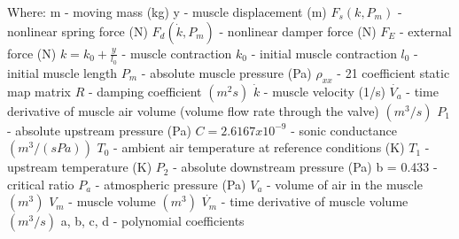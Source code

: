\documentclass[11pt,a4paper]{article}
\begin{document}
\begin{appendices}
Where: \newline
m - moving mass (kg)\newline
y - muscle displacement (m)\newline
$F_s(k, P_m)$ - nonlinear spring force (N)\newline
$F_d(\dot{k}, P_m)$ - nonlinear damper force (N)\newline
$F_E$ - external force (N)\newline
$k = k_0 + \frac{y}{l_0}$ - muscle contraction\newline
$k_0$ - initial muscle contraction\newline
$l_0$ - initial muscle length\newline
$P_m$ - absolute muscle pressure (Pa)\newline
$\rho_{xx}$ - 21 coefficient static map matrix\newline
$R$ - damping coefficient $(m^2s)$\newline
$\dot{k}$ - muscle velocity (1/s)\newline
$\dot{V_a}$ - time derivative of muscle air volume (volume flow rate through the valve) $(m^3/s)$
$P_1$ - absolute upstream pressure (Pa)\newline
$C = 2.6167x10^{-9}$ - sonic conductance $(m^3/(sPa))$\newline
$T_0$ - ambient air temperature at reference conditions (K)\newline
$T_1$ - upstream temperature (K)\newline
$P_2$ - absolute downstream pressure (Pa)\newline
b = 0.433 - critical ratio\newline
$P_a$ - atmospheric pressure (Pa)\newline
$V_a$ - volume of air in the muscle $(m^3)$\newline
$V_m$ - muscle volume $(m^3)$\newline
$\dot{V_m}$ - time derivative of muscle volume $(m^3/s)$\newline
a, b, c, d - polynomial coefficients

\clearpage
\end{appendices}

\printbibliography
\end{document}
